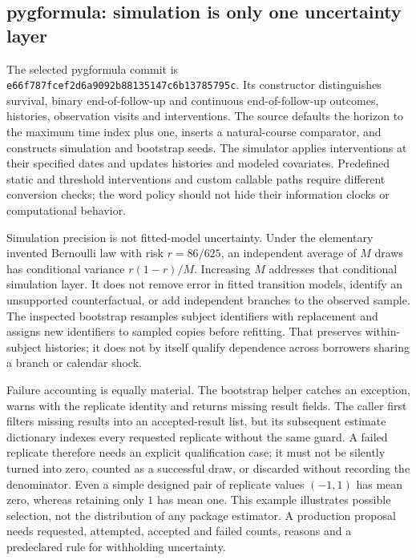 \subsection{pygformula: simulation is only one uncertainty layer}
The selected pygformula commit is
\texttt{e66f787fcef2d6a9092b88135147c6b13785795c}.
Its constructor distinguishes survival, binary end-of-follow-up and continuous
end-of-follow-up outcomes, histories, observation visits and interventions.
The source defaults the horizon to the maximum time index plus one, inserts
a natural-course comparator, and constructs simulation and bootstrap seeds.
The simulator applies interventions at their specified dates and updates
histories and modeled covariates. Predefined static and threshold interventions
and custom callable paths require different conversion checks; the word
policy should not hide their information clocks or computational behavior.
\citep{exec24_longpy_pygformula_source}

Simulation precision is not fitted-model uncertainty. Under the elementary
invented Bernoulli law with risk $r=86/625$, an independent average of $M$
draws has conditional variance $r(1-r)/M$. Increasing $M$ addresses that
conditional simulation layer. It does not remove error in fitted transition
models, identify an unsupported counterfactual, or add independent branches
to the observed sample. The inspected bootstrap resamples subject identifiers
with replacement and assigns new identifiers to sampled copies before
refitting. That preserves within-subject histories; it does not by itself
qualify dependence across borrowers sharing a branch or calendar shock.
\citep{exec24_longpy_reference,exec24_longpy_pygformula_source}

Failure accounting is equally material. The bootstrap helper catches an
exception, warns with the replicate identity and returns missing result
fields. The caller first filters missing results into an accepted-result list,
but its subsequent estimate dictionary indexes every requested replicate
without the same guard. A failed replicate therefore needs an explicit
qualification case; it must not be silently turned into zero, counted as a
successful draw, or discarded without recording the denominator. Even a
simple designed pair of replicate values $(-1,1)$ has mean zero, whereas
retaining only $1$ has mean one. This example illustrates possible selection,
not the distribution of any package estimator. A production proposal needs
requested, attempted, accepted and failed counts, reasons and a predeclared
rule for withholding uncertainty.~\citep{exec24_longpy_pygformula_source,exec24_longpy_reference}

